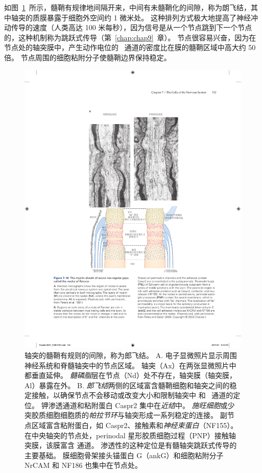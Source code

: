如图~\ref{fig:7_16}~所示，髓鞘有规律地间隔开来，中间有未髓鞘化的间隙，称为朗飞结，其中轴突的质膜暴露于细胞外空间约 1 微米处。 
这种排列方式极大地提高了神经冲动传导的速度（人类高达 100 米每秒），因为信号是从一个节点跳到下一个节点的，这种机制称为跳跃式传导（第~\ref{chap:chap9}~章）。 
节点很容易兴奋，因为在节点处的轴突膜中，产生动作电位的~ 通道的密度比在膜的髓鞘区域中高大约 50 倍。
节点周围的细胞粘附分子使髓鞘边界保持稳定。


\begin{figure}[htbp]
	\centering
	\includegraphics[width=0.75\linewidth]{chap07/fig_7_16}
	\caption{轴突的髓鞘有规则的间隙，称为郎飞结。
		A. 电子显微照片显示周围神经系统和脊髓轴突中的节点区域。
		轴突（Ax）在两张显微照片中都垂直延伸。
		\textit{髓磷脂}层在节点（Nd）处不存在，轴突膜（轴突膜，Al）暴露在外\cite{peters1991neuropil}。
		B. \textit{郎飞结}两侧的区域富含髓鞘细胞和轴突之间的稳定接触，以确保节点不会移动或改变大小和限制轴突中  和~ 通道的定位。
		钾渗透通道和粘附蛋白 Caspr2 集中在\textit{近结}中。
		\textit{施旺细胞}或少突胶质细胞细胞质的\textit{帕拉节环}与轴突形成一系列稳定的连接。
		副节点区域富含粘附蛋白，如 Caspr2、接触素和\textit{神经束蛋白}（NF155）。
		在中央轴突的节点处，perinodal 星形胶质细胞过程（PNP）接触轴突膜，该膜富含  通道。
		 渗透性的这种定位是有髓轴突跳跃式传导的主要基础。
		膜细胞骨架接头锚蛋白 G（ankG）和细胞粘附分子 NrCAM 和 NF186 也集中在节点处\cite{peles2000molecular}。}
	\label{fig:7_16}
\end{figure}


